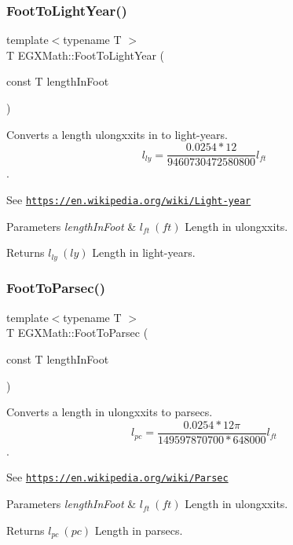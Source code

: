 \subsubsection{\texorpdfstring{Foot\+To\+Light\+Year()}{FootToLightYear()}}
{\footnotesize\ttfamily template$<$typename T $>$ \\
T E\+G\+X\+Math\+::\+Foot\+To\+Light\+Year (\begin{DoxyParamCaption}\item[{const T}]{length\+In\+Foot }\end{DoxyParamCaption})}



Converts a length ulongxxits in to light-\/years. \[ l_{ly}=\frac{0.0254 * 12}{9460730472580800} l_{ft} \]. 

See \href{https://en.wikipedia.org/wiki/Light-year}{\tt https\+://en.\+wikipedia.\+org/wiki/\+Light-\/year} 
\begin{DoxyParams}{Parameters}
{\em length\+In\+Foot} & $ l_{ft}\ (ft)$ Length in ulongxxits. \\
\hline
\end{DoxyParams}
\begin{DoxyReturn}{Returns}
$ l_{ly}\ (ly)$ Length in light-\/years. 
\end{DoxyReturn}
\mbox{\label{group___e_g_x_math-_conversions-_length_conversions-_imperial-_foot-_astronomical_gac6684ac6570b6ec9a0e30237bbb33f16}} 
\subsubsection{\texorpdfstring{Foot\+To\+Parsec()}{FootToParsec()}}
{\footnotesize\ttfamily template$<$typename T $>$ \\
T E\+G\+X\+Math\+::\+Foot\+To\+Parsec (\begin{DoxyParamCaption}\item[{const T}]{length\+In\+Foot }\end{DoxyParamCaption})}



Converts a length in ulongxxits to parsecs. \[ l_{pc}=\frac{0.0254 * 12 \pi}{149597870700 * 648000} l_{ft} \]. 

See \href{https://en.wikipedia.org/wiki/Parsec}{\tt https\+://en.\+wikipedia.\+org/wiki/\+Parsec} 
\begin{DoxyParams}{Parameters}
{\em length\+In\+Foot} & $ l_{ft}\ (ft)$ Length in ulongxxits. \\
\hline
\end{DoxyParams}
\begin{DoxyReturn}{Returns}
$ l_{pc}\ (pc)$ Length in parsecs. 
\end{DoxyReturn}
